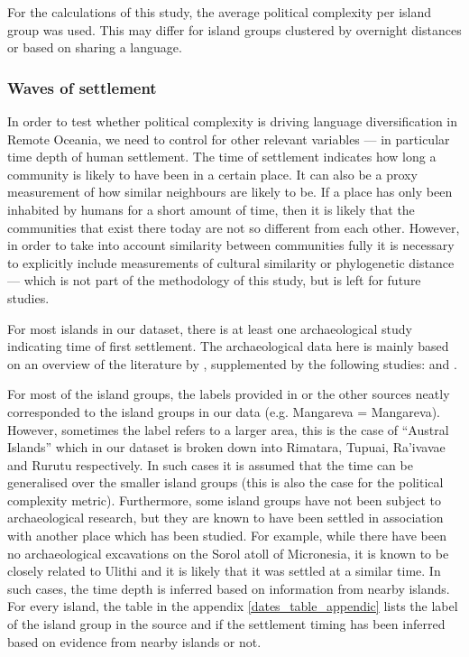 \documentclass[a4paper,10pt]{article} %
\begin{document}
For the calculations of this study, the average political complexity per island group was used. This may differ for island groups clustered by overnight distances or based on sharing a language.


\subsubsection{Waves of settlement}
\label{pol_complex_sec_dates}
In order to test whether political complexity is driving language diversification in Remote Oceania, we need to control for other relevant variables --- in particular time depth of human settlement. The time of settlement indicates how long a community is likely to have been in a certain place. It can also be a proxy measurement of how similar neighbours are likely to be. If a place has only been inhabited by humans for a short amount of time, then it is likely that the communities that exist there today are not so different from each other. However, in order to take into account similarity between communities fully it is necessary to explicitly include measurements of cultural similarity or phylogenetic distance --- which is not part of the methodology of this study, but is left for future studies.

For most islands in our dataset, there is at least one archaeological study indicating time of first settlement. The archaeological data here is mainly based on an overview of the literature by \citet{rieth_cochrane_2018}, supplemented by the following studies: \citet{intoh2007reconnaissance, intoh2008ongoing, carson2012recent, kirch2012basline, Napolitano_et_al_yap, ellis2012saipan} and \citet{levin_seikel_miles_2019}. 

For most of the island groups, the labels provided in \citet{rieth_cochrane_2018} or the other sources neatly corresponded to the island groups in our data (e.g. Mangareva = Mangareva). However, sometimes the label refers to a larger area, this is the case of ``Austral Islands'' which in our dataset is broken down into Rimatara, Tupuai, Ra'ivavae and Rurutu respectively. In such cases it is assumed that the time can be generalised over the smaller island groups (this is also the case for the political complexity metric). Furthermore, some island groups have not been subject to archaeological research, but they are known to have been settled in association with another place which has been studied. For example, while there have been no archaeological excavations on the Sorol atoll of Micronesia, it is known to be closely related to Ulithi \citep[23]{quackenbush1968sonsorol} and it is likely that it was settled at a similar time. In such cases, the time depth is inferred based on information from nearby islands. For every island, the table in the appendix \ref{dates_table_appendic} lists the label of the island group in the source and if the settlement timing has been inferred based on evidence from nearby islands or not.
\end{document}

